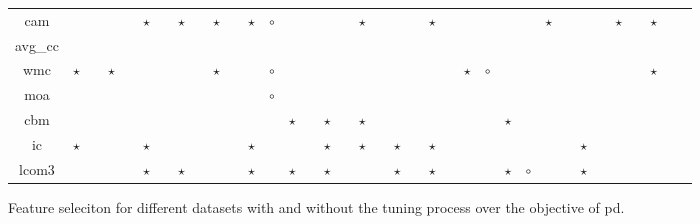 \documentclass{acm_proc_article-sp}
\begin{document}
\begin{figure*}[!ht]
{\begin{tabular}{c|c c|c c|c c|c c|c c|c c|c c|c c|c c|c c|c c|c c|c c|c c|c c|c c|c c|c }
cam& & & & & $\star$& & $\star$& & $\star$& & $\star$& $\circ$& & & & & $\star$& & & & $\star$& & & & & & $\star$& & & & $\star$& & $\star$& \\
avg\_cc& & & & & & & & & & & & & & & & & & & & & & & & & & & & & & & & & & \\
wmc& $\star$& & $\star$& & & & & & $\star$& & & $\circ$& & & & & & & & & & & $\star$& $\circ$& & & & & & & & & $\star$& \\
moa& & & & & & & & & & & & $\circ$& & & & & & & & & & & & & & & & & & & & & & \\
cbm& & & & & & & & & & & & & $\star$& & $\star$& & $\star$& & & & & & & & $\star$& & & & & & & & & \\
ic& $\star$& & & & $\star$& & & & & & $\star$& & & & $\star$& & $\star$& & $\star$& & $\star$& & & & & & & & $\star$& & & & & \\
lcom3& & & & & $\star$& & $\star$& & & & $\star$& & $\star$& & $\star$& & & & $\star$& & $\star$& & & & $\star$& $\circ$& & & $\star$& & & & & \\

  \end{tabular}}
    \caption{Feature seleciton for different datasets with  and without the tuning process over the objective of pd. }
\end{figure*}
\end{document}
